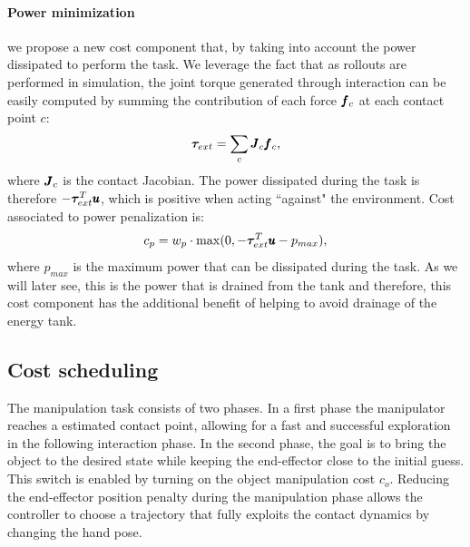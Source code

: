 \paragraph{Power minimization} we propose a new cost component that, by taking into account the power dissipated to perform the task. We leverage the fact that as rollouts are performed in simulation, the joint torque generated through interaction can be easily computed by summing the contribution of each force $\pmb{f}_c$ at each contact point $c$:
\begin{equation}
\boldsymbol{\tau}_{ext} = \sum\limits_{c} \pmb{J}_c \pmb{f}_c,    
\end{equation}
where $\pmb{J}_c$ is the contact Jacobian. The power dissipated during the task is therefore $-\boldsymbol{\tau}_{ext}^T\pmb{u}$, which is positive when acting ``against" the environment. Cost associated to power penalization is:
\begin{equation}
   c_p = w_{p} \cdot \max(0, - \boldsymbol{\tau}_{ext}^T\pmb{u} - p_{max}),      
 \end{equation}
where $p_{max}$ is the maximum power that can be dissipated during the task.
As we will later see, this is the power that is drained from the tank and therefore, this cost component has the additional benefit of helping to avoid drainage of the energy tank.


\subsection{Cost scheduling}
The manipulation task consists of two phases. In a first phase the manipulator reaches a estimated contact point, allowing for a fast and successful exploration in the following interaction phase. In the second phase, the goal is to bring the object to the desired state while keeping the end-effector close to the initial guess. This switch is enabled by turning on the object manipulation cost $c_o$. Reducing the end-effector position penalty during the manipulation phase allows the controller to choose a trajectory that fully exploits the contact dynamics by changing the hand pose. 


